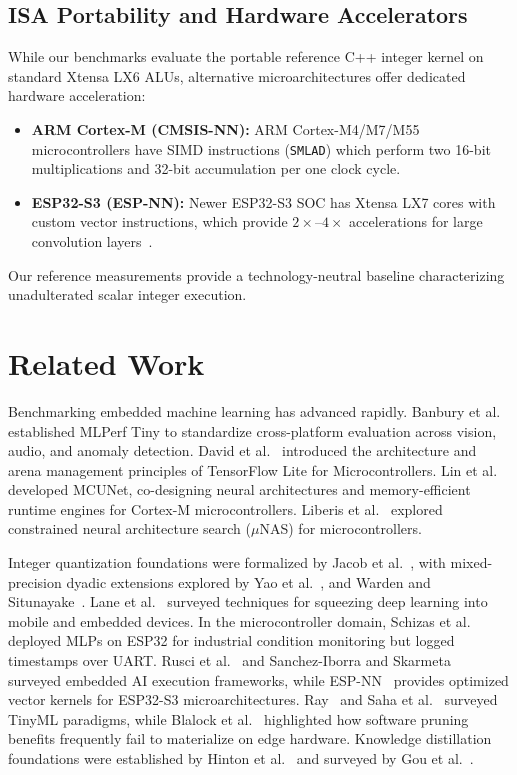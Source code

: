 \documentclass[journal,10pt]{IEEEtran}
\begin{document}
\subsection{ISA Portability and Hardware Accelerators}
While our benchmarks evaluate the portable reference C++ integer kernel on standard Xtensa LX6 ALUs, alternative microarchitectures offer dedicated hardware acceleration:
\begin{itemize}
    \item \textbf{ARM Cortex-M (CMSIS-NN):} ARM Cortex-M4/M7/M55 microcontrollers have SIMD instructions (\texttt{SMLAD}) which perform two 16-bit multiplications and 32-bit accumulation per one clock cycle.
    \item \textbf{ESP32-S3 (ESP-NN):} Newer ESP32-S3 SOC has Xtensa LX7 cores with custom vector instructions, which provide $2\times\text{--}4\times$ accelerations for large convolution layers~\cite{espnn2021}.
\end{itemize}
Our reference measurements provide a technology-neutral baseline characterizing unadulterated scalar integer execution.

\section{Related Work}
Benchmarking embedded machine learning has advanced rapidly. Banbury et al.~\cite{banbury2021benchmarking} established MLPerf Tiny to standardize cross-platform evaluation across vision, audio, and anomaly detection. David et al.~\cite{david2021tensorflow} introduced the architecture and arena management principles of TensorFlow Lite for Microcontrollers. Lin et al.~\cite{lin2020mcunet,lin2021mcunetv2} developed MCUNet, co-designing neural architectures and memory-efficient runtime engines for Cortex-M microcontrollers. Liberis et al.~\cite{liberis2021munas} explored constrained neural architecture search ($\mu$NAS) for microcontrollers.

Integer quantization foundations were formalized by Jacob et al.~\cite{jacob2018quantization}, with mixed-precision dyadic extensions explored by Yao et al.~\cite{yao2021tinyml}, and Warden and Situnayake~\cite{warden2019tinyml}. Lane et al.~\cite{lane2017squeezing} surveyed techniques for squeezing deep learning into mobile and embedded devices. In the microcontroller domain, Schizas et al.~\cite{schizas2022tinyml} deployed MLPs on ESP32 for industrial condition monitoring but logged timestamps over UART. Rusci et al.~\cite{rusci2020workload} and Sanchez-Iborra and Skarmeta~\cite{sanchez2020tinyml} surveyed embedded AI execution frameworks, while ESP-NN~\cite{espnn2021} provides optimized vector kernels for ESP32-S3 microarchitectures. Ray~\cite{ray2022review} and Saha et al.~\cite{saha2022tinyml} surveyed TinyML paradigms, while Blalock et al.~\cite{blalock2020state} highlighted how software pruning benefits frequently fail to materialize on edge hardware. Knowledge distillation foundations were established by Hinton et al.~\cite{hinton2015distilling} and surveyed by Gou et al.~\cite{gou2021knowledge}.
\end{document}
